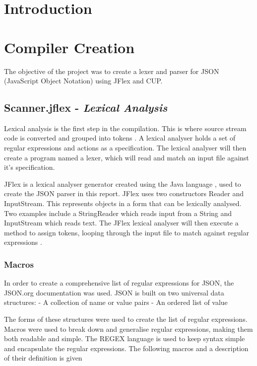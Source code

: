 \section{Introduction}\label{introduction}

\section{Compiler Creation}\label{compiler-creation}

The objective of the project was to create a lexer and parser for JSON
(JavaScript Object Notation) using JFlex and CUP.

\subsection{\texorpdfstring{Scanner.jflex - \emph{Lexical
Analysis}}{Scanner.jflex - Lexical Analysis}}\label{scanner.jflex---lexical-analysis}

Lexical analysis is the first step in the compilation. This is where
source stream code is converted and grouped into tokens
\cite{lexicalAna}. A lexical analyser holds a set of regular expressions
and actions as a specification. The lexical analyser will then create a
program named a lexer, which will read and match an input file against
it's specification.

JFlex is a lexical analyser generator created using the Java language
\cite{JFlexJFl92:online}, used to create the JSON parser in this report.
JFlex uses two constructors Reader and InputStream. This represents
objects in a form that can be lexically analysed. Two examples include a
StringReader which reads input from a String and InputStream which reads
text. The JFlex lexical analyser will then execute a method to assign
tokens, looping through the input file to match against regular
expressions \cite{lexicalAna}.

\subsubsection{Macros}\label{macros}

In order to create a comprehensive list of regular expressions for JSON,
the JSON.org \cite{JSON95:online} documentation was used. JSON is built
on two universal data structures: - A collection of name or value pairs
- An ordered list of value

The forms of these structures were used to create the list of regular
expressions. Macros were used to break down and generalise regular
expressions, making them both readable and simple. The REGEX language is
used to keep syntax simple and encapsulate the regular expressions. The
following macros and a description of their definition is given

